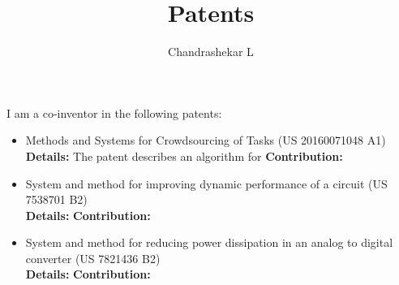 \documentclass[onecolumn,12pt]{IEEEtran}
\title{\Large Patents}
\author{Chandrashekar L}
\date{}
\begin{document}
\maketitle
I am a co-inventor in the following patents:
\begin{itemize}
\item {Methods and Systems for Crowdsourcing of Tasks (US 20160071048 A1)}\\
\textbf{Details:} The patent describes an algorithm for
\textbf{Contribution:}
\item System and method for improving dynamic performance of a circuit (US 7538701 B2)\\
\textbf{Details:}
\textbf{Contribution:}
\item System and method for reducing power dissipation in an analog to digital converter (US 7821436 B2)\\
\textbf{Details:}
\textbf{Contribution:}
\end{itemize}
\end{document}
